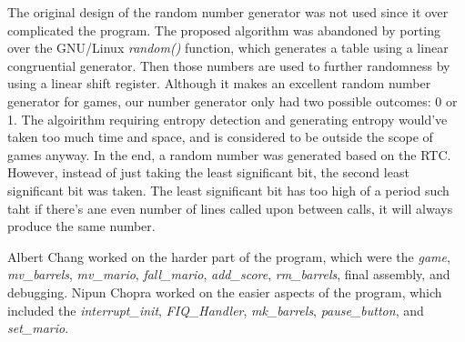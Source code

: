 \documentclass[letterpaper,10pt]{article}
\begin{document}
    The original design of the random number generator was not used since it
    over complicated the program. The proposed algorithm was abandoned by porting
    over the GNU/Linux \textit{random()} function, which generates a table using
    a linear congruential generator. Then those numbers are used to further
    randomness by using a linear shift register. Although it makes an excellent
    random number generator for games, our number generator only had two possible
    outcomes: 0 or 1. The algoirithm requiring entropy detection and generating
    entropy would've taken too much time and space, and is considered to be
    outside the scope of games anyway. In the end, a random number was generated
    based on the RTC. However, instead of just taking the least significant bit,
    the second least significant bit was taken. The least significant bit has
    too high of a period such taht if there's ane even number of lines called
    upon between calls, it will always produce the same number.

    Albert Chang worked on the harder part of the program, which were the
    \textit{game}, \textit{mv\_barrels}, \textit{mv\_mario}, \textit{fall\_mario},
    \textit{add\_score}, \textit{rm\_barrels}, final assembly, and debugging.
    Nipun Chopra worked on the easier aspects of the program, which included
    the \textit{interrupt\_init}, \textit{FIQ\_Handler}, \textit{mk\_barrels},
    \textit{pause\_button}, and \textit{set\_mario}.
\end{document}
